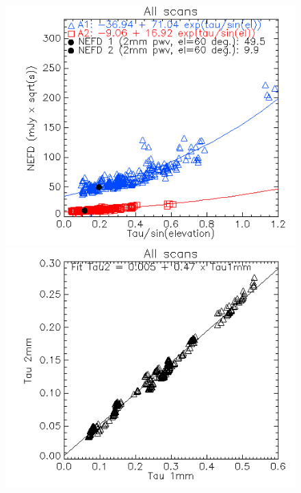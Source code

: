 \documentclass[a4paper, 11pt]{article} %
\begin{document}
\begin{figure}
\begin{center}
\includegraphics[clip, angle=0, scale =
  0.5]{Figures/NEFD_vs_tau_20170226s415_FXDC0C1_Jy_common_mode_kids_out.png}
\includegraphics[clip, angle=0, scale =
  0.5]{Figures/tau1_tau2_20170226s415_FXDC0C1_GaussPhot_common_mode_kids_out.png}
\caption{}
\label{fig:fov}
\end{center}
\end{figure}
\end{document}
